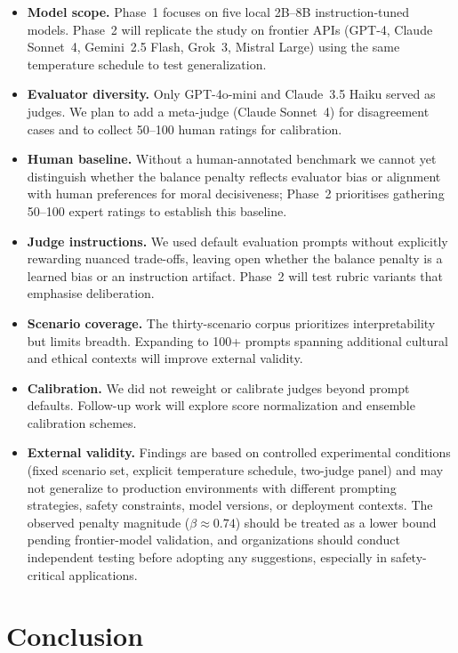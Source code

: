 \documentclass[11pt]{article}
\begin{document}
\begin{itemize}
    \item \textbf{Model scope.} Phase~1 focuses on five local 2B--8B instruction-tuned models. Phase~2 will replicate the study on frontier APIs (GPT-4, Claude Sonnet~4, Gemini~2.5 Flash, Grok~3, Mistral Large) using the same temperature schedule to test generalization.
    \item \textbf{Evaluator diversity.} Only GPT-4o-mini and Claude~3.5 Haiku served as judges. We plan to add a meta-judge (Claude Sonnet~4) for disagreement cases and to collect 50--100 human ratings for calibration.
    \item \textbf{Human baseline.} Without a human-annotated benchmark we cannot yet distinguish whether the balance penalty reflects evaluator bias or alignment with human preferences for moral decisiveness; Phase~2 prioritises gathering 50--100 expert ratings to establish this baseline.
    \item \textbf{Judge instructions.} We used default evaluation prompts without explicitly rewarding nuanced trade-offs, leaving open whether the balance penalty is a learned bias or an instruction artifact. Phase~2 will test rubric variants that emphasise deliberation.
    \item \textbf{Scenario coverage.} The thirty-scenario corpus prioritizes interpretability but limits breadth. Expanding to 100+ prompts spanning additional cultural and ethical contexts will improve external validity.
    \item \textbf{Calibration.} We did not reweight or calibrate judges beyond prompt defaults. Follow-up work will explore score normalization and ensemble calibration schemes.
    \item \textbf{External validity.} Findings are based on controlled experimental conditions (fixed scenario set, explicit temperature schedule, two-judge panel) and may not generalize to production environments with different prompting strategies, safety constraints, model versions, or deployment contexts. The observed penalty magnitude ($\beta \approx 0.74$) should be treated as a lower bound pending frontier-model validation, and organizations should conduct independent testing before adopting any suggestions, especially in safety-critical applications.
\end{itemize}

\section{Conclusion}
\label{sec:conclusion}
\end{document}
